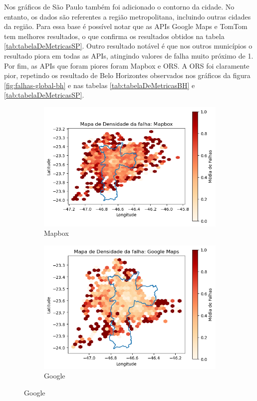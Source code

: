 Nos gráficos de São Paulo também foi adicionado o contorno da cidade. No entanto, os dados são referentes a região metropolitana, incluindo outras cidades da região. Para essa base é possível notar que as APIs Google Maps e TomTom tem melhores resultados, o que confirma os resultados obtidos na tabela \ref{tab:tabelaDeMetricasSP}. Outro resultado notável é que nos outros municípios o resultado piora em todas as APIs, atingindo valores de falha muito próximo de 1. Por fim, as APIs que foram piores foram Mapbox e ORS. A ORS foi claramente pior, repetindo os resultado de Belo Horizontes observados nos gráficos da figura \ref{fig:falhas-global-bh} e nas tabelas \ref{tab:tabelaDeMetricasBH} e \ref{tab:tabelaDeMetricasSP}.

\begin{figure}[ht]
  \centering
  \begin{subfigure}[b]{0.45\textwidth}
    \includegraphics[width=\textwidth]{Figuras/falhasMapboxSP.png}
    \caption{Mapbox}
    \label{fig:falhasmapboxS}
  \end{subfigure}
  \hfill
  \begin{subfigure}[b]{0.45\textwidth}
    \includegraphics[width=\textwidth]{Figuras/falhasGoogleSP.png}
    \caption{Google}
    \label{fig:falhasgoogleS}
  \end{subfigure}


\end{figure}
